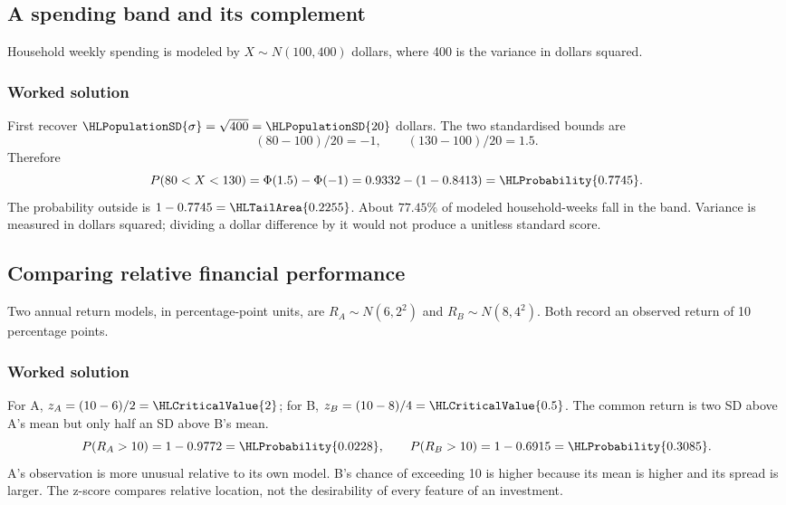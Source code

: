 \subsection{A spending band and its complement}\label{prob:sec:general-worked1}
Household weekly spending is modeled by $X\sim N(100,400)$ dollars, where 400 is the variance in dollars squared.
\subsubsection*{Worked solution}\label{sol:sec:general-worked1}
First recover $\HLPopulationSD{\sigma}=\sqrt{400}=\HLPopulationSD{20}$ dollars. The two standardised bounds are
\[
(80-100)/20=-1,\qquad (130-100)/20=1.5.
\]
Therefore
\[
P(80<X<130)=\Phi(1.5)-\Phi(-1)
=0.9332-(1-0.8413)=\HLProbability{0.7745}.
\]
The probability outside is $1-0.7745=\HLTailArea{0.2255}$. About $77.45\%$ of modeled household-weeks fall in the band. Variance is measured in dollars squared; dividing a dollar difference by it would not produce a unitless standard score.


\subsection{Comparing relative financial performance}\label{prob:sec:general-worked2}
Two annual return models, in percentage-point units, are $R_A\sim N(6,2^2)$ and $R_B\sim N(8,4^2)$. Both record an observed return of 10 percentage points.
\subsubsection*{Worked solution}\label{sol:sec:general-worked2}
For A, $z_A=(10-6)/2=\HLCriticalValue{2}$; for B, $z_B=(10-8)/4=\HLCriticalValue{0.5}$. The common return is two SD above A's mean but only half an SD above B's mean.
\[
P(R_A>10)=1-0.9772=\HLProbability{0.0228},\qquad
P(R_B>10)=1-0.6915=\HLProbability{0.3085}.
\]
A's observation is more unusual relative to its own model. B's chance of exceeding 10 is higher because its mean is higher and its spread is larger. The z-score compares relative location, not the desirability of every feature of an investment.
